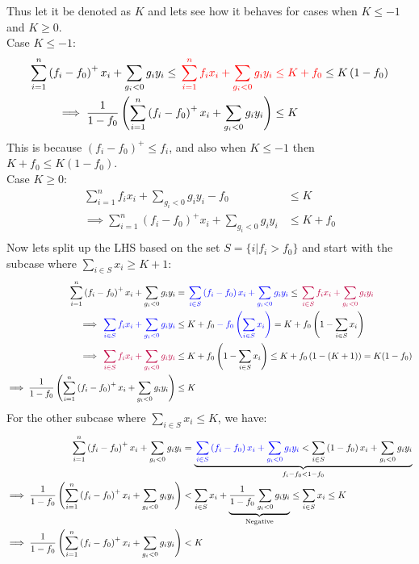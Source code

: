 \documentclass{article}
\begin{document}
Thus let it be denoted as $K$ and lets see how it behaves for cases when $K \leq -1$ and $K \geq 0$.\\
Case $K\leq -1$:
\begin{align*}
    \sum_{i=1}^{n} \left(f_i - f_0\right)^+ x_i + \sum_{g_i < 0} g_i y_i \leq {\color{red}{}\sum_{i=1}^{n} f_i x_i + \sum_{g_i < 0} g_i y_i} &{\color{red}{}\leq K + f_0} \leq K\left(1-f_0\right)\\
    \implies \frac{1}{1-f_0} \left( \sum_{i=1}^{n}  \left(f_i - f_0\right)^+ x_i + \sum_{g_i < 0} g_i y_i \right) &\leq K\\
\end{align*}
This is because $ \left(f_i - f_0\right)^+ \leq f_i$, and also when $K \leq -1$ then $K + f_0 \leq K\left(1-f_0\right)$.\\
Case $K\geq 0$:
\begin{align*}
    \sum_{i=1}^{n} f_i x_i + \sum_{g_i < 0} g_i y_i - f_0  &\leq K \\
    \implies \sum_{i=1}^{n} \left(f_i-f_0\right)^+ x_i + \sum_{g_i < 0} g_i y_i &\leq K + f_0 \\
\end{align*}
Now lets split up the LHS based on the set $S = \{ i | f_i > f_0 \}$ and start with the subcase where $\sum_{i\in S} x_i \geq K+1$:
\begin{align*}
    \sum_{i=1}^{n} \left(f_i-f_0\right)^+ x_i + \sum_{g_i < 0} g_i y_i &= {\color{blue}{}\sum_{i \in S} \left(f_i-f_0\right) x_i + \sum_{g_i < 0} g_i y_i} \leq {\color{purple}{}\sum_{i \in S} f_i x_i + \sum_{g_i < 0} g_i y_i}\\
    \implies {\color{blue}{}\sum_{i \in S} f_i x_i + \sum_{g_i < 0} g_i y_i} &\leq K + f_0 {\color{blue}{}- f_0\left(\sum_{i \in S} x_i\right)} = K+f_0\left(1 - \sum_{i \in S} x_i\right)\\
    \implies {\color{purple}{}\sum_{i \in S} f_i x_i + \sum_{g_i < 0} g_i y_i} &\leq K+f_0\left(1 - \sum_{i \in S} x_i\right) \leq K + f_0\left(1 - (K+1)\right) = K(1-f_0)\\
    \implies \frac{1}{1-f_0} \left( \sum_{i=1}^{n} \left(f_i-f_0\right)^+ x_i + \sum_{g_i < 0} g_i y_i \right) &\leq K\\
\end{align*}
For the other subcase where $\sum_{i\in S} x_i \leq K$, we have:
\begin{align*}
    \sum_{i=1}^{n} \left(f_i-f_0\right)^+ x_i + \sum_{g_i < 0} g_i y_i &= \underbrace{{\color{blue}{}\sum_{i \in S} \left(f_i-f_0\right) x_i + \sum_{g_i < 0} g_i y_i} < \sum_{i \in S} \left(1-f_0\right) x_i + \sum_{g_i < 0} g_i y_i}_{f_i-f_0 < 1-f_0}\\
    \implies \frac{1}{1-f_0} \left( \sum_{i=1}^{n} \left(f_i-f_0\right)^+ x_i + \sum_{g_i < 0} g_i y_i \right) &< \sum_{i \in S} x_i + \underbrace{\frac{1}{1-f_0}\sum_{g_i < 0} g_i y_i}_{\text{Negative}} \leq \sum_{i \in S} x_i \leq K\\
    \implies \frac{1}{1-f_0} \left( \sum_{i=1}^{n} \left(f_i-f_0\right)^+ x_i + \sum_{g_i < 0} g_i y_i \right) &< K\\
\end{align*}
\end{document}
